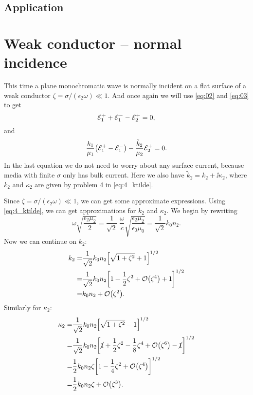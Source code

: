 \documentclass[11pt,letter, swedish, english
]{article}
\begin{document}


\subsection{Application}








\section{Weak conductor -- normal incidence}
\newcommand{\kt}{\tilde{k}}

This time a plane monochromatic wave is normally incident on a flat
surface of a weak conductor $\zeta=\sigma/(\epsilon_2\omega)\ll1$. And
once again we will use \eqref{eq:02} and \eqref{eq:03} to get
\begin{equation}\label{eq:2_BC1}
{\mathcal{E}_1^+}+{\mathcal{E}_1^-} -{\mathcal{E}_2^+} =0, 
\end{equation}
and 
\begin{equation}\label{eq:2_BC2}
\frac{k_1}{\mu_1}\qty(\Ep-\Em) 
-\frac{\kt_2}{\mu_2}\Epp =0.
\end{equation}
In the last equation we do not need to worry about any surface
current, because media with finite $\sigma$ only has bulk
current. Here we also have $\kt_{2} = k_2 + \ii\kappa_2$, where
$k_2$ and $\kappa_2$ are given by problem 4 in \eqref{eq:4_ktilde}.

Since $\zeta=\sigma/(\epsilon_2\omega)\ll1$, we can get some
approximate expressions. Using \eqref{eq:4_ktilde}, we can get
approximations for $k_2$ and $\kappa_2$. We begin by rewriting
\begin{equation}
\omega\sqrt{\frac{\epsilon_2\mu_2}{2}} 
=\frac{1}{\sqrt{2}}\; \frac{\omega}{c} 
\sqrt{\frac{\epsilon_2\mu_2}{\epsilon_0\mu_0}}
=\frac{1}{\sqrt{2}}k_0n_2.
\end{equation}
Now we can continue on $k_2$:
\begin{equation}
\begin{aligned}
k_2 =& \frac{1}{\sqrt{2}}k_0n_2
\qty[\sqrt{1+\zeta^2}+1]^{1/2}\\
=& \frac{1}{\sqrt{2}}k_0n_2
\qty[1+\frac{1}{2}\zeta^2+\order{\zeta^4}+1]^{1/2}\\
=& k_0n_2  +\order{\zeta^2}.
\end{aligned}
\end{equation}
Similarly for $\kappa_2$:
\begin{equation}
\begin{aligned}
\kappa_2 =& \frac{1}{\sqrt{2}}k_0n_2
\qty[\sqrt{1+\zeta^2}-1]^{1/2}\\
=& \frac{1}{\sqrt{2}}k_0n_2
\qty[\cancel{1}+\frac{1}{2}\zeta^2-\frac{1}{8}\zeta^4+
\order{\zeta^6}-\cancel{1}]^{1/2}\\
=& \frac{1}{2}k_0n_2\zeta
\qty[1-\frac{1}{4}\zeta^2+\order{\zeta^4}]^{1/2}\\
=& \frac{1}{2}k_0n_2\zeta +\order{\zeta^3}.
\end{aligned}
\end{equation}
\end{document}
